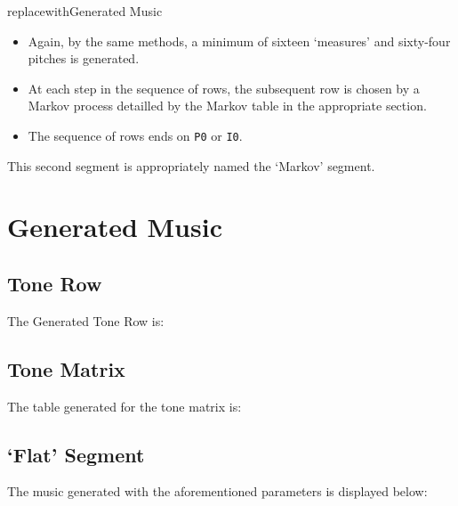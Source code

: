 \documentclass[10pt,letterpaper]{article}
\newcommand{\code}[1]{\colorbox{light-gray}{\texttt{#1}}}
\begin{document}
replacewith{Generated Music}
\begin{itemize}
  \item{Again, by the same methods, a minimum of sixteen `measures' and
    sixty-four pitches is generated. }
  \item{At each step in the sequence of rows, the subsequent row is chosen by a Markov
    process detailled by the Markov table in the appropriate section.}
  \item{The sequence of rows ends on \code{P0} or \code{I0}. }
\end{itemize}

This second segment is appropriately named the `Markov' segment.

\clearpage{}

\section*{Generated Music}

\subsection*{Tone Row}

The Generated Tone Row is:

\begin{quote}
{%
\parindent 0pt
\noindent
\ifx\preLilyPondExample \undefined
\else
  \expandafter\preLilyPondExample
\fi
\def\lilypondbook{}%
%
\ifx\postLilyPondExample \undefined
\else
  \expandafter\postLilyPondExample
\fi
}
\end{quote}

\subsection*{Tone Matrix}

The table generated for the tone matrix is:



\clearpage{}

\subsection*{`Flat' Segment}
The music generated with the aforementioned parameters is displayed below:
\end{document}
